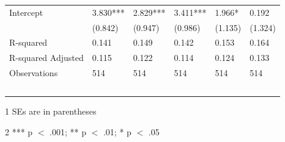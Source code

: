 \documentclass[12pt]{article}
\begin{document}
\begin{table}[!ht]
\begin{tabular}{llllll}
        Intercept & 3.830*** & 2.829*** & 3.411*** & 1.966* & 0.192 \\
        ~ & (0.842) & (0.947) & (0.986) & (1.135) & (1.324) \\
        R-squared & 0.141 & 0.149 & 0.142 & 0.153 & 0.164 \\
        R-squared Adjusted & 0.115 & 0.122 & 0.114 & 0.124 & 0.133 \\
        Observations  & 514 & 514 & 514 & 514 & 514 \\
        ~ & ~ & ~ & ~ & ~ & ~ \\
        \midrule
    \end{tabular}
    \begin{tablenotes}
      \item[1] SEs are in parentheses
      \item[2] *** p $<$ .001; ** p $<$ .01; * p $<$ .05
    \end{tablenotes}
  \label{table8}
\end{table}
\end{document}
